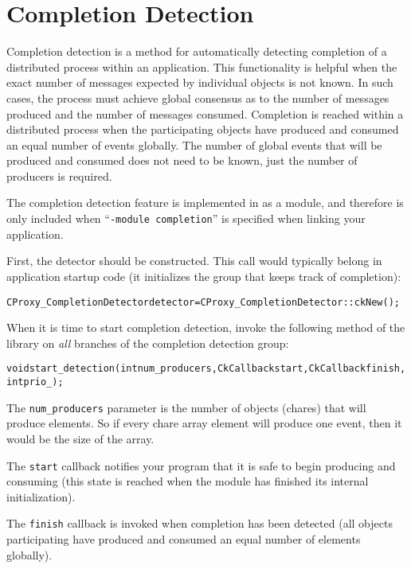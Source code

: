\section{Completion Detection}

Completion detection is a method for automatically detecting completion of a
distributed process within an application. This functionality is helpful when
the exact number of messages expected by individual objects is not known. In
such cases, the process must achieve global consensus as to the number of
messages produced and the number of messages consumed.  Completion is reached
within a distributed process when the participating objects have produced and
consumed an equal number of events globally. The number of global events that
will be produced and consumed does not need to be known, just the number of
producers is required.


The completion detection feature is implemented in \charmpp{} as a
module, and therefore is only included when ``{\tt -module completion}'' is
specified when linking your application.

First, the detector should be constructed. This call would typically
belong in application startup code (it initializes the group that
keeps track of completion):

\begin{alltt}
CProxy_CompletionDetector detector = CProxy_CompletionDetector::ckNew();
\end{alltt}

When it is time to start completion detection, invoke the following method of the
library on {\em all} branches of the completion detection group:

\begin{alltt}
void start_detection(int num_producers, CkCallback start, CkCallback finish, int prio_);
\end{alltt}

The \verb|num_producers| parameter is the number of objects (chares)
that will produce elements. So if every chare array element will produce one
event, then it would be the size of the array.

The \verb|start| callback notifies your program that it is safe to
begin producing and consuming (this state is reached when the module
has finished its internal initialization).

The \verb|finish| callback is invoked when completion has been
detected (all objects participating have produced and consumed an
equal number of elements globally).

